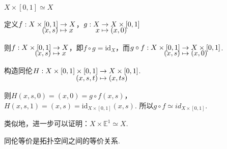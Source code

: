 \begin{instance}
    $X \times [0,1] \simeq X$\par
    定义$\setjot[-4]\begin{aligned}[t]
        f: X \times [0,1] &\to X \\
        (x, s) &\mapsto x
    \end{aligned}$，$\setjot[-4]\begin{aligned}[t]
         g: X &\to X \times [0,1]\\
         x &\mapsto (x, 0)
    \end{aligned}$\par
    则$\setjot[-4]\begin{aligned}[t]
        f: X \times [0,1] &\to X \\
        (x, s) &\mapsto x
    \end{aligned}$，即$f \circ g = \mathrm{id}_X$，而$\setjot[-4]\begin{aligned}[t]
        g \circ f: X \times [0,1] &\to X \times [0,1] \\
        (x, s) &\mapsto (x, 0)
    \end{aligned}$.\par
    构造同伦$\setjot[-2]\begin{aligned}[t]
        H: X \times [0,1] \times [0,1] &\to X \times [0,1] \\
        (x, s, t) &\mapsto (x, ts)
    \end{aligned} $.\par
    则$H(x, s, 0) = (x, 0) = g \circ f(x, s)$，$H(x, s, 1) = (x, s) = \mathrm{id}_{X \times [0,1]}(x, s)$.
    所以$g \circ f \simeq id_{X \times [0,1]}$.\par
    类似地，进一步可以证明：$X \times \mathbb{E}^1 \simeq X$.
\end{instance}

\begin{proposition}[][prop:10.4]
    同伦等价是拓扑空间之间的等价关系.
\end{proposition}

